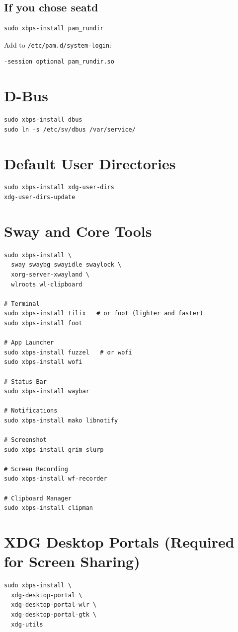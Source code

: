 \documentclass[12pt, a4paper]{book}
\begin{document}
\subsection{If you chose seatd}
\begin{lstlisting}
sudo xbps-install pam_rundir
\end{lstlisting}
Add to \texttt{/etc/pam.d/system-login}:
\begin{lstlisting}
-session optional pam_rundir.so
\end{lstlisting}

\section{D-Bus}
\begin{lstlisting}
sudo xbps-install dbus
sudo ln -s /etc/sv/dbus /var/service/
\end{lstlisting}

\section{Default User Directories}
\begin{lstlisting}
sudo xbps-install xdg-user-dirs
xdg-user-dirs-update
\end{lstlisting}

\section{Sway and Core Tools}
\begin{lstlisting}
sudo xbps-install \
  sway swaybg swayidle swaylock \
  xorg-server-xwayland \
  wlroots wl-clipboard

# Terminal
sudo xbps-install tilix   # or foot (lighter and faster)
sudo xbps-install foot

# App Launcher
sudo xbps-install fuzzel   # or wofi
sudo xbps-install wofi

# Status Bar
sudo xbps-install waybar

# Notifications
sudo xbps-install mako libnotify

# Screenshot
sudo xbps-install grim slurp

# Screen Recording
sudo xbps-install wf-recorder

# Clipboard Manager
sudo xbps-install clipman
\end{lstlisting}

\section{XDG Desktop Portals (Required for Screen Sharing)}
\begin{lstlisting}
sudo xbps-install \
  xdg-desktop-portal \
  xdg-desktop-portal-wlr \
  xdg-desktop-portal-gtk \
  xdg-utils
\end{lstlisting}
\end{document}
